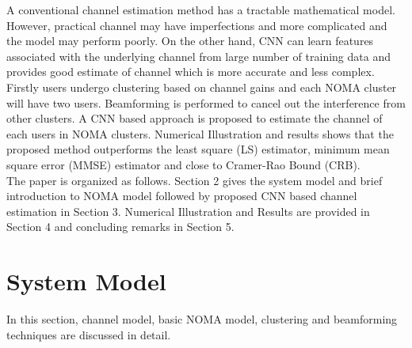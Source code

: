 \documentclass[journal]{IEEEtran}
\begin{document}
A conventional channel estimation method has a tractable mathematical model. However, practical channel may have imperfections and more complicated and the model may perform poorly. On the other hand, CNN can learn features associated with the underlying channel from large number of training data and provides good estimate of channel which is more accurate and less complex. Firstly users undergo clustering based on channel gains and each NOMA cluster will have two users. Beamforming is performed to cancel out the interference from other clusters. A CNN based approach is proposed to estimate the channel of each users in NOMA clusters. Numerical Illustration and results shows that the proposed method outperforms the least square (LS) estimator, minimum mean square error (MMSE) estimator and close to Cramer-Rao Bound (CRB).\\
The paper is organized as follows. Section 2 gives the system model and brief introduction to NOMA model followed by proposed CNN based channel estimation in Section 3. Numerical Illustration and Results are provided in Section 4 and concluding remarks in Section 5.\\

\section{System Model}
In this section, channel model, basic NOMA model, clustering and beamforming techniques are discussed in detail.
\end{document}
